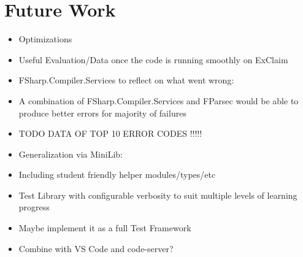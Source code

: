 \section{Future Work} %
  \label{Future Work} %


\begin{marker}[high]
\begin{itemize}
  \item Optimizations
  \item Useful Evaluation/Data once the code is running smoothly on ExClaim
  \item FSharp.Compiler.Services to reflect on what went wrong:
  \item A combination of FSharp.Compiler.Services and FParsec would be able to produce better errors for majority of failures
  \item TODO DATA OF TOP 10 ERROR CODES !!!!!
  \item Generalization via MiniLib:
  \item Including student friendly helper modules/types/etc
  \item Test Library with configurable verbosity to suit multiple levels of learning progress 
  \item Maybe implement it as a full Test Framework
  \item Combine with VS Code and code-server?
\end{itemize}
\end{marker}






